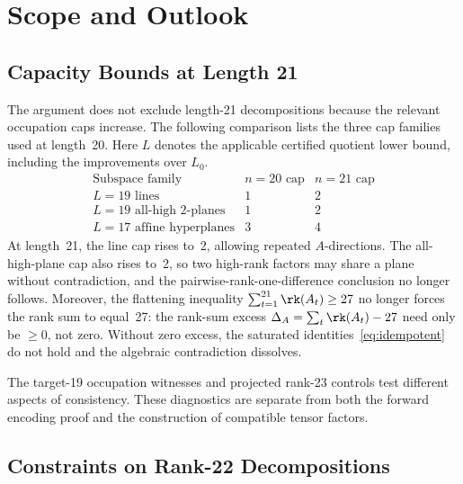 \documentclass[11pt,a4paper]{article}
\begin{document}
\section{Scope and Outlook}\label{sec:outlook}

\subsection{Capacity Bounds at Length 21}

The argument does not exclude length-21 decompositions because the relevant
occupation caps increase. The following comparison lists the three cap
families used at length~20. Here $L$ denotes the applicable certified
quotient lower bound, including the improvements over $L_0$.
\[
  \begin{array}{c|cc}
    \text{Subspace family} & n=20\text{ cap} & n=21\text{ cap} \\ \hline
    L=19\text{ lines} & 1 & 2 \\
    L=19\text{ all-high 2-planes} & 1 & 2 \\
    L=17\text{ affine hyperplanes} & 3 & 4
  \end{array}
\]
At length~21, the line cap rises to~2, allowing repeated $A$-directions.  The all-high-plane cap also rises to~2, so two high-rank factors may share a plane without contradiction, and the pairwise-rank-one-difference conclusion no longer follows.  Moreover, the flattening inequality $\sum_{t=1}^{21}\rk(A_t)\ge 27$ no longer forces the rank sum to equal~27: the rank-sum excess $\Delta_A=\sum_t\rk(A_t)-27$ need only be $\ge 0$, not zero.  Without zero excess, the saturated identities~\eqref{eq:idempotent} do not hold and the algebraic contradiction dissolves.

The target-19 occupation witnesses and projected rank-23 controls test different aspects of consistency. These diagnostics are separate from both the forward encoding proof and the construction of compatible tensor factors.

\subsection{Constraints on Rank-22 Decompositions}
\end{document}
